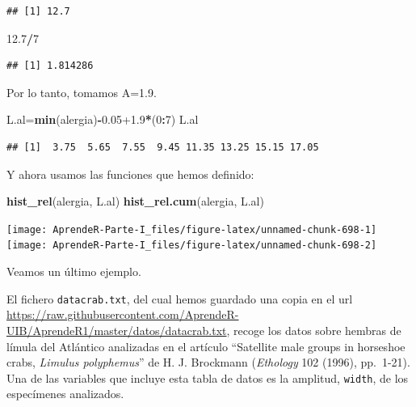 \documentclass[]{book}
\newenvironment{Shaded}{\begin{snugshade}}{\end{snugshade}}
\newcommand{\DecValTok}[1]{\textcolor[rgb]{0.00,0.00,0.81}{#1}}
\newcommand{\FloatTok}[1]{\textcolor[rgb]{0.00,0.00,0.81}{#1}}
\newcommand{\KeywordTok}[1]{\textcolor[rgb]{0.13,0.29,0.53}{\textbf{#1}}}
\newcommand{\NormalTok}[1]{#1}
\newcommand{\OperatorTok}[1]{\textcolor[rgb]{0.81,0.36,0.00}{\textbf{#1}}}
\theoremstyle{definition}
\theoremstyle{definition}
\theoremstyle{definition}
\theoremstyle{remark}
\let\BeginKnitrBlock\begin \let\EndKnitrBlock\end
\begin{document}
\begin{verbatim}
## [1] 12.7
\end{verbatim}

\begin{Shaded}
\begin{Highlighting}[]
\FloatTok{12.7}\OperatorTok{/}\DecValTok{7}
\end{Highlighting}
\end{Shaded}

\begin{verbatim}
## [1] 1.814286
\end{verbatim}

Por lo tanto, tomamos A=1.9.

\begin{Shaded}
\begin{Highlighting}[]
\NormalTok{L.al=}\KeywordTok{min}\NormalTok{(alergia)}\OperatorTok{-}\FloatTok{0.05+1.9}\OperatorTok{*}\NormalTok{(}\DecValTok{0}\OperatorTok{:}\DecValTok{7}\NormalTok{) }
\NormalTok{L.al}
\end{Highlighting}
\end{Shaded}

\begin{verbatim}
## [1]  3.75  5.65  7.55  9.45 11.35 13.25 15.15 17.05
\end{verbatim}

Y ahora usamos las funciones que hemos definido:

\begin{Shaded}
\begin{Highlighting}[]
\KeywordTok{hist_rel}\NormalTok{(alergia, L.al)}
\KeywordTok{hist_rel.cum}\NormalTok{(alergia, L.al)}
\end{Highlighting}
\end{Shaded}

\begin{center}\texttt{[image: AprendeR-Parte-I\_files/figure-latex/unnamed-chunk-698-1]} \texttt{[image: AprendeR-Parte-I\_files/figure-latex/unnamed-chunk-698-2]} \end{center}

Veamos un último ejemplo.

\BeginKnitrBlock{example}
\protect\hypertarget{exm:crab}{}{\label{exm:crab} }El fichero \texttt{datacrab.txt}, del cual hemos guardado una copia en el url \url{https://raw.githubusercontent.com/AprendeR-UIB/AprendeR1/master/datos/datacrab.txt}, recoge los datos sobre hembras de límula del Atlántico analizadas en el artículo ``Satellite male groups in horseshoe crabs, \emph{Limulus polyphemus}'' de H. J. Brockmann (\emph{Ethology} 102 (1996), pp.~1-21). Una de las variables que incluye esta tabla de datos es la amplitud, \texttt{width}, de los especímenes analizados.
\EndKnitrBlock{example}
\end{document}
